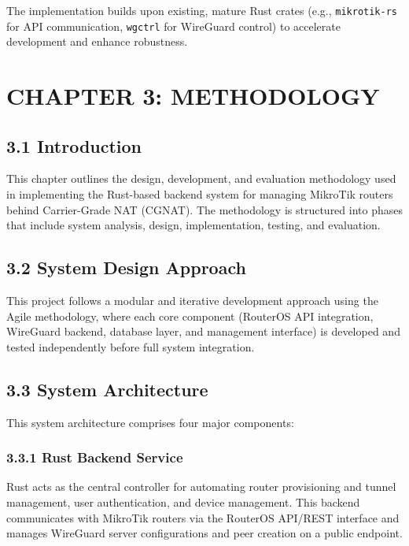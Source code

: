 \documentclass[12pt,a4paper,oneside]{report}
\begin{document}
The implementation builds upon existing, mature Rust crates (e.g., \texttt{mikrotik-rs} for API communication, \texttt{wgctrl} for WireGuard control) to accelerate development and enhance robustness.

\chapter{CHAPTER 3: METHODOLOGY}

\section{3.1 Introduction}

This chapter outlines the design, development, and evaluation methodology used in implementing the Rust-based backend system for managing MikroTik routers behind Carrier-Grade NAT (CGNAT). The methodology is structured into phases that include system analysis, design, implementation, testing, and evaluation.

\section{3.2 System Design Approach}

This project follows a modular and iterative development approach using the Agile methodology, where each core component (RouterOS API integration, WireGuard backend, database layer, and management interface) is developed and tested independently before full system integration.

\section{3.3 System Architecture}

This system architecture comprises four major components:

\subsection{3.3.1 Rust Backend Service}

Rust acts as the central controller for automating router provisioning and tunnel management, user authentication, and device management. This backend communicates with MikroTik routers via the RouterOS API/REST interface and manages WireGuard server configurations and peer creation on a public endpoint.
\end{document}
